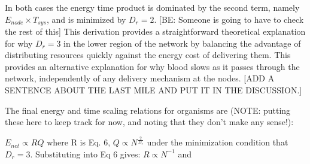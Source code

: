 \documentclass[12pt]{article}
\begin{document}

In both cases the energy time product is dominated by the second term, namely
$E_{node} \times T_{sys}$, and is minimized by $D_r =2$. [BE: Someone is going
to have to check the rest of this]
This derivation provides a straightforward theoretical explanation for why $D_r =
3$ in the lower region of the network by balancing the advantage of
distributing resources quickly against the energy cost of delivering
them.  This provides an alternative explanation for why blood slows
as it passes through the network, independently of any delivery
mechanism at the nodes.  [ADD A SENTENCE ABOUT THE LAST MILE AND PUT
IT IN THE DISCUSSION.]


The final energy and time scaling relations for organisms are  (NOTE:  putting
these here to keep track for now, and noting that they don't make any sense!):

$E_{net} \propto RQ$ where R is Eq. 6,  $Q \propto N^{\frac{2}{D_r}}$ under the minimization condition that $D_r = 3$.
Substituting into Eq 6 gives: $R \propto N^{-1}$ and
\end{document}
